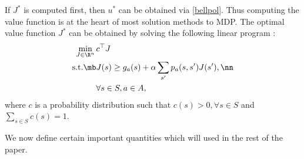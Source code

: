 If $J^*$ is computed first, then $u^*$ can be obtained via \eqref{bellpol}. Thus computing the value function is at the heart of most solution methods to MDP.
The optimal value function $J^*$ can be obtained by solving the following linear program :
\begin{align}\label{mdplp}
\min_{J\in \R^n}\, &c^\top J\\
\text{s.t.}\mb &J(s)\geq g_a(s)+\alpha\sum_{s'}p_a(s,s')J(s'),\nn\\
&\forall s \in S, a \in A,
\end{align}
where $c$ is a probability distribution such that $c(s)>0, \forall s \in S$ and $\sum_{s\in S}c(s)=1$.
\begin{comment}
The LP formulation in \eqref{mdplp} can also be represented in short by either of the below linear programs (which are idential but differ in notation),\begin{minipage}{.5\columnwidth}
\begin{align}\label{mdplpshort}
\begin{split}
\min_{J\in \R^n}\, &c^\top J\\
\text{s.t.}\mb &J\geq T J,
\end{split}
\end{align}
\end{minipage}%
\begin{minipage}{.5\columnwidth}
\begin{align}
\begin{split}
\min_{J\in \R^n}\, &c^\top J\\
\text{s.t.}\mb &EJ\geq H J,
\end{split}
\end{align}
\end{minipage}\\
\end{comment}
We now define certain important quantities which will used in the rest of the paper.
